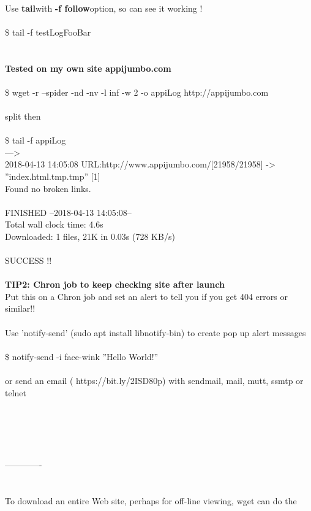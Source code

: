 \documentclass[10pt,a4paper]{article}
\begin{document}
{{{{{{{{\\
Use \textbf{tail}}{\large  with \textbf{-f follow}}{\large  option, so can see it working !\\
\\
	\$ tail -f testLogFooBar\\
\\
\\
\textbf{Tested on my own site appijumbo.com}}{\large \\
\\
\$ wget -r --spider -nd -nv -l inf -w 2 -o appiLog http://appijumbo.com}{\large \\
\\
split then\\
\\
\$ tail -f appiLog\\
--->\\
2018-04-13 14:05:08 URL:http://www.appijumbo.com/}{\large  [21958/21958] -> ''index.html.tmp.tmp'' [1]\\
Found no broken links.\\
\\
FINISHED --2018-04-13 14:05:08--\\
Total wall clock time: 4.6s\\
Downloaded: 1 files, 21K in 0.03s (728 KB/s)\\
\\
SUCCESS !!\\
\\
\textbf{TIP2: Chron job to keep checking site after launch}}{\large {\large \\
Put this on a Chron job and set an alert to tell you if you get 404 errors or similar!!\\
\\
Use 'notify-send'  (sudo apt install libnotify-bin) to create pop up alert messages \\
\\
	\$ notify-send -i face-wink ''Hello World!''\\
\\
or send an email ( https://bit.ly/2ISD80p}{\large  ) with sendmail, mail, mutt, ssmtp or telnet\\
\\
\\
\\
\\
\\
-------------\\
\\
\\
To download an entire Web site, perhaps for off-line viewing, wget can do the\\
}}}}}}}}}
\end{document}
